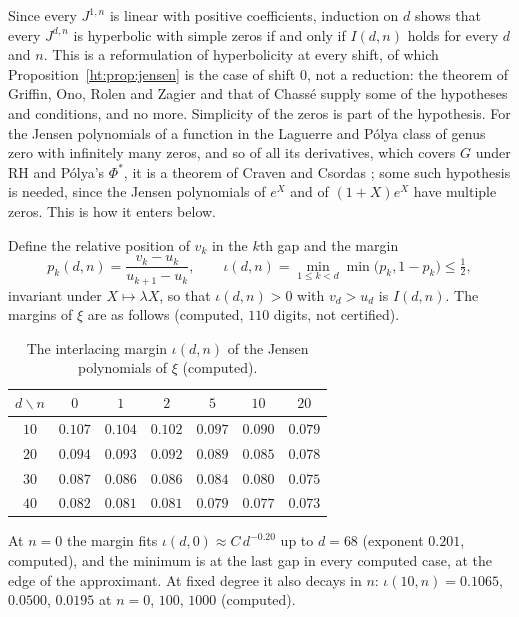 Since every $J^{1,n}$ is linear with positive coefficients, induction on $d$ shows that every $J^{d,n}$ is hyperbolic with simple zeros if and only if $I(d,n)$ holds for every $d$ and $n$. This is a reformulation of hyperbolicity at every shift, of which Proposition~\ref{ht:prop:jensen} is the case of shift $0$, not a reduction: the theorem of Griffin, Ono, Rolen and Zagier \cite{GORZ19} and that of Chass\'e supply some of the hypotheses and conditions, and no more. Simplicity of the zeros is part of the hypothesis. For the Jensen polynomials of a function in the Laguerre and P\'olya class of genus zero with infinitely many zeros, and so of all its derivatives, which covers $G$ under RH and P\'olya's $\Phi^*$, it is a theorem of Craven and Csordas \cite{CravenCsordas89}; some such hypothesis is needed, since the Jensen polynomials of $e^X$ and of $(1+X)e^X$ have multiple zeros. This is how it enters below.

Define the relative position of $v_k$ in the $k$th gap and the margin
\[
p_k(d,n)=\frac{v_k-u_k}{u_{k+1}-u_k},\qquad \iota(d,n)=\min_{1\le k<d}\min\big(p_k,1-p_k\big)\le\tfrac12,
\]
invariant under $X\mapsto\lambda X$, so that $\iota(d,n)>0$ with $v_d>u_d$ is $I(d,n)$. The margins of $\xi$ are as follows (computed, $110$ digits, not certified).

\begin{table}[ht]
\centering\small
\begin{tabular}{ccccccc}
\toprule
$d\backslash n$ & $0$ & $1$ & $2$ & $5$ & $10$ & $20$\\
\midrule
$10$ & $0.107$ & $0.104$ & $0.102$ & $0.097$ & $0.090$ & $0.079$\\
$20$ & $0.094$ & $0.093$ & $0.092$ & $0.089$ & $0.085$ & $0.078$\\
$30$ & $0.087$ & $0.086$ & $0.086$ & $0.084$ & $0.080$ & $0.075$\\
$40$ & $0.082$ & $0.081$ & $0.081$ & $0.079$ & $0.077$ & $0.073$\\
\bottomrule
\end{tabular}
\caption{The interlacing margin $\iota(d,n)$ of the Jensen polynomials of $\xi$ (computed).}\label{ht:tab:margin}
\end{table}

At $n=0$ the margin fits $\iota(d,0)\approx C\,d^{-0.20}$ up to $d=68$ (exponent $0.201$, computed), and the minimum is at the last gap in every computed case, at the edge of the approximant. At fixed degree it also decays in $n$: $\iota(10,n)=0.1065$, $0.0500$, $0.0195$ at $n=0$, $100$, $1000$ (computed).

